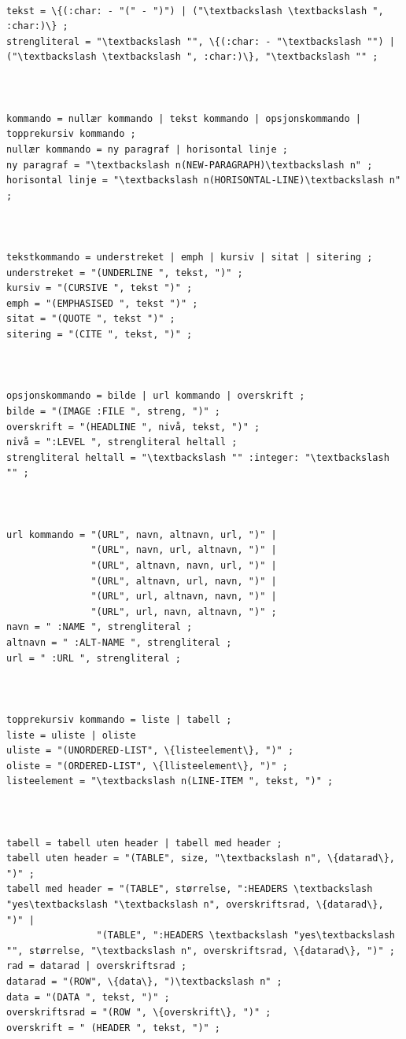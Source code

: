 \documentclass[norsk, 11pt, a4paper]{article}
\begin{document}
\begin{lstlisting}

tekst = \{(:char: - "(" - ")") | ("\textbackslash \textbackslash ", :char:)\} ;
strengliteral = "\textbackslash "", \{(:char: - "\textbackslash "") | ("\textbackslash \textbackslash ", :char:)\}, "\textbackslash "" ;



kommando = nullær kommando | tekst kommando | opsjonskommando | topprekursiv kommando ;
nullær kommando = ny paragraf | horisontal linje ;
ny paragraf = "\textbackslash n(NEW-PARAGRAPH)\textbackslash n" ;
horisontal linje = "\textbackslash n(HORISONTAL-LINE)\textbackslash n" ;



tekstkommando = understreket | emph | kursiv | sitat | sitering ;
understreket = "(UNDERLINE ", tekst, ")" ;
kursiv = "(CURSIVE ", tekst ")" ;
emph = "(EMPHASISED ", tekst ")" ;
sitat = "(QUOTE ", tekst ")" ;
sitering = "(CITE ", tekst, ")" ;



opsjonskommando = bilde | url kommando | overskrift ;
bilde = "(IMAGE :FILE ", streng, ")" ;
overskrift = "(HEADLINE ", nivå, tekst, ")" ;
nivå = ":LEVEL ", strengliteral heltall ;
strengliteral heltall = "\textbackslash "" :integer: "\textbackslash "" ;



url kommando = "(URL", navn, altnavn, url, ")" | 
    	       "(URL", navn, url, altnavn, ")" |
	           "(URL", altnavn, navn, url, ")" | 
	           "(URL", altnavn, url, navn, ")" |
	           "(URL", url, altnavn, navn, ")" |
	           "(URL", url, navn, altnavn, ")" ;
navn = " :NAME ", strengliteral ;
altnavn = " :ALT-NAME ", strengliteral ;
url = " :URL ", strengliteral ;



topprekursiv kommando = liste | tabell ; 
liste = uliste | oliste
uliste = "(UNORDERED-LIST", \{listeelement\}, ")" ;
oliste = "(ORDERED-LIST", \{llisteelement\}, ")" ;
listeelement = "\textbackslash n(LINE-ITEM ", tekst, ")" ;



tabell = tabell uten header | tabell med header ;
tabell uten header = "(TABLE", size, "\textbackslash n", \{datarad\}, ")" ;
tabell med header = "(TABLE", størrelse, ":HEADERS \textbackslash "yes\textbackslash "\textbackslash n", overskriftsrad, \{datarad\}, ")" |
       	   	    "(TABLE", ":HEADERS \textbackslash "yes\textbackslash "", størrelse, "\textbackslash n", overskriftsrad, \{datarad\}, ")" ;
rad = datarad | overskriftsrad ;
datarad = "(ROW", \{data\}, ")\textbackslash n" ;
data = "(DATA ", tekst, ")" ;
overskriftsrad = "(ROW ", \{overskrift\}, ")" ;
overskrift = " (HEADER ", tekst, ")" ;
\end{lstlisting}
\end{document}
